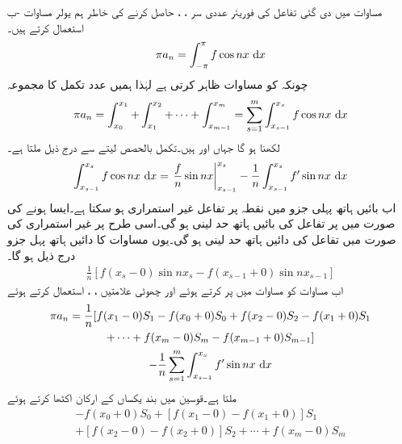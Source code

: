 مساوات  میں دی گئی تفاعل  کی فوریئر عددی سر ، ،  حاصل کرنے کی خاطر ہم یولر مساوات -ب استعمال کرتے ہیں۔
\begin{align}\label{مساوات_فوریئر_بائیں_دائیں_حد_الف}
\pi a_n=\int_{-\pi}^{\pi} f \cos nx \, \dif x
\end{align}
چونکہ  کو مساوات  ظاہر کرتی ہے لہٰذا ہمیں  عدد تکمل کا مجموعہ
\begin{align}\label{مساوات_فوریئر_بائیں_دائیں_حد_ب}
\pi a_n=\int_{x_0}^{x_1}+\int_{x_1}^{x_2}+\cdots+\int_{x_{m-1}}^{x_m}=\sum_{s=1}^{m}\int_{x_{s-1}}^{x_s} f\cos nx\, \dif x
\end{align}
لکھنا ہو گا جہاں  اور  ہیں۔تکمل بالحصص لیتے سے درج ذیل ملتا ہے۔
\begin{align}\label{مساوات_فوریئر_بائیں_دائیں_حد_پ}
\int_{x_{s-1}}^{x_s} f \cos nx\, \dif x=\left. \frac{f}{n} \sin nx\right|_{x_{s-1}}^{x_s}-\frac{1}{n}\int_{x_{s-1}}^{x_s} f'\sin nx\,\dif x
\end{align}
اب بائیں ہاتھ پہلی جزو میں نقطہ  پر تفاعل  غیر استمراری ہو سکتا ہے۔ایسا ہونے کی صورت میں  پر تفاعل کی بائیں ہاتھ حد  لینی ہو گی۔اسی طرح  پر غیر استمراری  کی صورت میں تفاعل کی دائیں ہاتھ حد  لینی ہو گی۔یوں  مساوات  کا دائیں ہاتھ پہل جزو درج ذیل ہو گا۔
\begin{align*}
\frac{1}{n}[f(x_s-0)\sin nx_s-f(x_{s-1}+0)\sin nx_{s-1}]
\end{align*} 
اب مساوات  کو مساوات  میں پر کرتے ہوئے اور چھوٹی علامتیں ، ،   استعمال کرتے ہوئے
\begin{multline}\label{مساوات_فوریئر_بائیں_دائیں_حد_ت}
\pi a_n=\frac{1}{n}[f(x_1-0)S_1-f(x_0+0)S_0+f(x_2-0)S_2-f(x_1+0)S_1\\
+\cdots +f(x_m-0)S_m-f(x_{m-1}+0)S_{m-1}]\\
-\frac{1}{n}\sum_{s=1}^{m}\int_{x_{s-1}}^{x_s} f' \sin nx \,\dif x
\end{multline}
ملتا ہے۔قوسین میں بند  یکساں  کے ارکان اکٹھا کرتے ہوئے 
\begin{multline}\label{مساوات_فوریئر_بائیں_دائیں_حد_ٹ}
-f(x_0+0)S_0+[f(x_1-0)-f(x_1+0)]S_1\\
+[f(x_2-0)-f(x_2+0)]S_2+\cdots+f(x_m-0)S_m
\end{multline}
